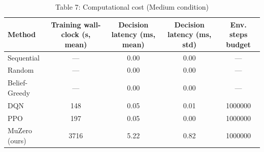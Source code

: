 \begin{table}[htbp]
\centering
\caption{Table 7: Computational cost (Medium condition)}
\begin{tabular}{lcccc}
\toprule
Method & Training wall-clock (s, mean) & Decision latency (ms, mean) & Decision latency (ms, std) & Env. steps budget \\
\midrule
Sequential & — & 0.00 & 0.00 & — \\
Random & — & 0.00 & 0.00 & — \\
Belief-Greedy & — & 0.00 & 0.00 & — \\
DQN & 148 & 0.05 & 0.01 & 1000000 \\
PPO & 197 & 0.05 & 0.00 & 1000000 \\
MuZero (ours) & 3716 & 5.22 & 0.82 & 1000000 \\
\bottomrule
\end{tabular}
\end{table}
